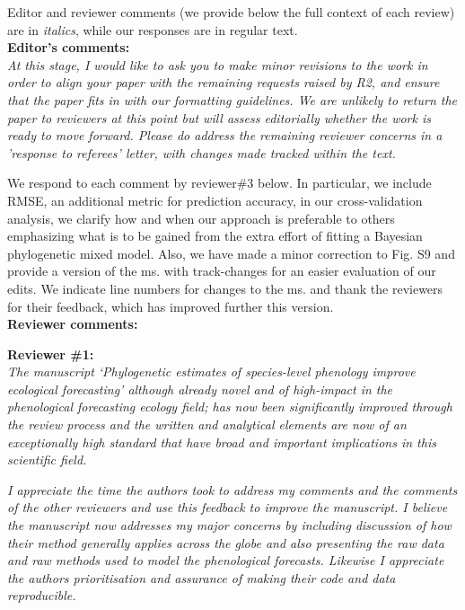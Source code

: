 \documentclass[11pt]{article}
\begin{document}
Editor and reviewer comments (we provide below the full context of each review) are in \emph{italics}, while our responses are in regular text. 
\\ %

{\bf Editor's comments:} \\


\emph{At this stage, I would like to ask you to make minor revisions to the work in order to align your paper with the remaining requests raised by R2, and ensure that the paper fits in with our formatting guidelines. We are unlikely to return the paper to reviewers at this point but will assess editorially whether the work is ready to move forward. Please do address the remaining reviewer concerns in a 'response to referees' letter, with changes made tracked within the text.}

We respond to each comment by reviewer\#3 below. In particular, we include RMSE, an additional metric for prediction accuracy, in our cross-validation analysis, we clarify how and when our approach is preferable to others emphasizing what is to be gained from the extra effort of fitting a Bayesian phylogenetic mixed model. Also, we have made a minor correction to Fig. S9 and provide a version of the ms. with track-changes for an easier evaluation of our edits. We indicate line numbers for changes to the ms. and thank the reviewers for their feedback, which has improved further this version.\\

{\bf Reviewer comments:} 

{\bf Reviewer \#1:}\\

\emph{The manuscript ‘Phylogenetic estimates of species-level phenology improve ecological forecasting’ although already novel and of high-impact in the phenological forecasting ecology field; has now been significantly improved through the review process and the written and analytical elements are now of an exceptionally high standard that have broad and important implications in this scientific field.}

\emph{I appreciate the time the authors took to address my comments and the comments of the other reviewers and use this feedback to improve the manuscript. I believe the manuscript now addresses my major concerns by including discussion of how their method generally applies across the globe and also presenting the raw data and raw methods used to model the phenological forecasts. Likewise I appreciate the authors prioritisation and assurance of making their code and data reproducible.}
\end{document}
